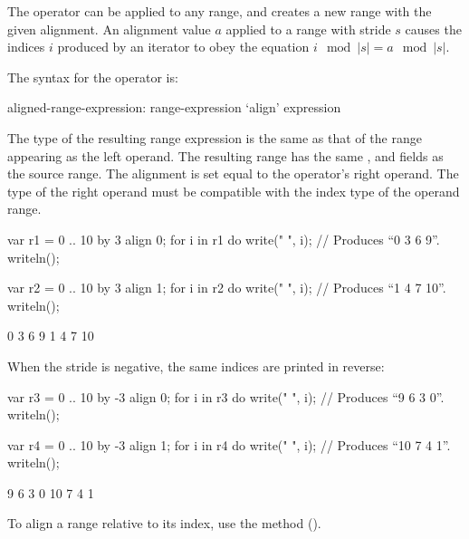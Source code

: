 The  operator can be applied to any range, and creates a new range
with the given alignment.  An alignment value $a$ applied to a range with stride $s$ causes the indices $i$ produced by an iterator
to obey the equation $i\!\mod |s| = a\!\mod |s|$.

The syntax for the  operator is:
\begin{syntax}
aligned-range-expression:
  range-expression `align' expression
\end{syntax}
\noindent The type of the resulting range expression is the same as that of the
range appearing as the left operand.  The resulting range has the
same ,  and  fields as the source range. The
alignment is set equal to the  operator's right operand.  The type
of the right operand must be compatible with the index type of the operand range.  

\begin{example}
\begin{chapelpre}
\end{chapelpre}
\begin{chapel}
var r1 = 0 .. 10 by 3 align 0;
for i in r1 do
  write(" ", i);			// Produces ``0 3 6 9''.
writeln();

var r2 = 0 .. 10 by 3 align 1;
for i in r2 do
  write(" ", i);			// Produces ``1 4 7 10''.
writeln();
\end{chapel}
\begin{chapeloutput}
 0 3 6 9
 1 4 7 10
\end{chapeloutput}
\end{example}

When the stride is negative, the same indices are printed in reverse:
\begin{example}
\begin{chapelpre}
\end{chapelpre}
\begin{chapel}
var r3 = 0 .. 10 by -3 align 0;
for i in r3 do
  write(" ", i);			// Produces ``9 6 3 0''.
writeln();

var r4 = 0 .. 10 by -3 align 1;
for i in r4 do
  write(" ", i);			// Produces ``10 7 4 1''.
writeln();
\end{chapel}
\begin{chapeloutput}
 9 6 3 0
 10 7 4 1
\end{chapeloutput}
\end{example}

To align a range relative to its  index, use
the  method ().



